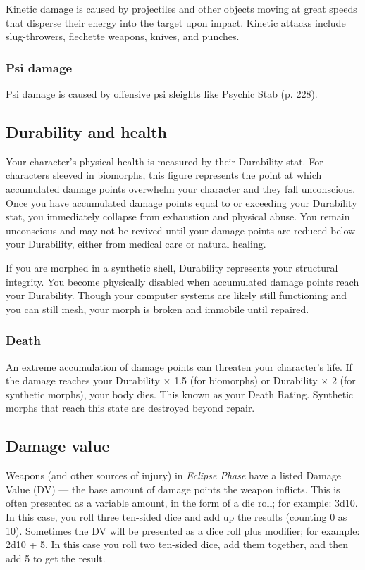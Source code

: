 Kinetic damage is caused by projectiles and other objects moving at great speeds that disperse their energy into the target upon impact. Kinetic attacks include slug-throwers, flechette weapons, knives, and punches.

\subsubsection{Psi damage}

Psi damage is caused by offensive psi sleights like Psychic Stab (p. 228).


\subsection{Durability and health}
\label{sec:durability-health}

Your character’s physical health is measured by their Durability stat. For characters sleeved in biomorphs, this figure represents the point at which accumulated damage points overwhelm your character and they fall unconscious. Once you have accumulated damage points equal to or exceeding your Durability stat, you immediately collapse from exhaustion and physical abuse. You remain unconscious and may not be revived until your damage points are reduced below your Durability, either from medical care or natural healing.

If you are morphed in a synthetic shell, Durability represents your structural integrity. You become physically disabled when accumulated damage points reach your Durability. Though your computer systems are likely still functioning and you can still mesh, your morph is broken and immobile until repaired.


\subsubsection{Death}

An extreme accumulation of damage points can threaten your character’s life. If the damage reaches your Durability $\times$ 1.5 (for biomorphs) or Durability $\times$ 2 (for synthetic morphs), your body dies. This known as your Death Rating. Synthetic morphs that reach this state are destroyed beyond repair.

\subsection{Damage value}

Weapons (and other sources of injury) in \emph{Eclipse Phase} have a listed Damage Value (DV) --- the base amount of damage points the weapon inflicts. This is often presented as a variable amount, in the form of a die roll; for example: 3d10. In this case, you roll three ten-sided dice and add up the results (counting 0 as 10). Sometimes the DV will be presented as a dice roll plus modifier; for example: 2d10 + 5. In this case you roll two ten-sided dice, add them together, and then add 5 to get the result.

